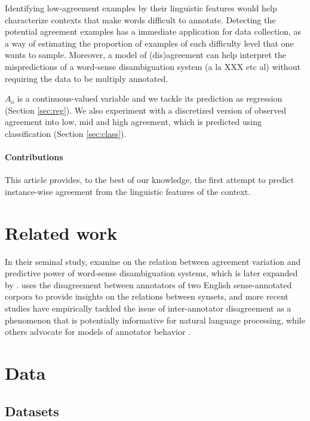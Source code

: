 \documentclass[11pt,a4paper]{article}
\begin{document}
Identifying low-agreement examples by their linguistic features would help characterize contexts that make words difficult to annotate. Detecting the potential agreement examples has a immediate application for data collection, as a way of estimating the proportion of examples of each difficulty level that one wants to sample. Moreover, a model of (dis)agreement can help interpret the mispredictions of a word-sense disambiguation system (a la XXX etc al) without requiring the data to be multiply annotated. 

$A_o$ is a continuous-valued variable and we tackle its prediction as regression (Section \ref{sec:reg}). We also experiment with a discretized version of observed agreement into low, mid and high agreement, which is predicted using classification (Section \ref{sec:class}).  

\paragraph{Contributions} This article provides, to the best of our knowledge, the first attempt to predict instance-wise agreement from the linguistic features of the context.
\section{Related work}
In their seminal study,  examine on the relation between agreement variation and predictive power of word-sense disambiguation systems, which is later expanded by .
 uses the disagreement between annotators of two English sense-annotated corpora to provide insights on the relations between synsets, and more recent studies \cite{Plank2014,Jurgens2013,Jurgens2014} have empirically tackled the issue of inter-annotator disagreement as a phenomenon that is potentially informative for natural language processing, while others advocate for models of annotator behavior \cite{Passonneau2014,Cohn2013}. 

\section{Data}
\subsection{Datasets}
\end{document}
